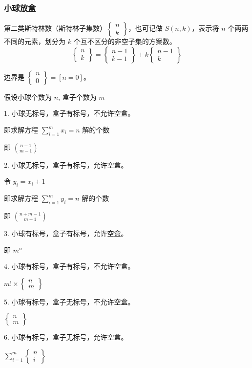 \documentclass[a4paper]{article}
\begin{document}
\subsubsection{小球放盒}
第二类斯特林数（斯特林子集数）$\begin{Bmatrix}n\\ k\end{Bmatrix}$，也可记做 $S(n,k)$，表示将 $n$ 个两两不同的元素，划分为 $k$ 个互不区分的非空子集的方案数。
$$
\begin{Bmatrix}n\\ k\end{Bmatrix}=\begin{Bmatrix}n-1\\ k-1\end{Bmatrix}+k\begin{Bmatrix}n-1\\ k\end{Bmatrix}
$$

边界是 $\begin{Bmatrix}n\\ 0\end{Bmatrix}=[n=0]$。

假设小球个数为 $n$, 盒子个数为 $m$

1. 小球无标号，盒子有标号，不允许空盒。

   即求解方程 $\sum\limits_{i=1}^mx_i=n$ 解的个数

   即 $\binom{n-1}{m-1}$

2. 小球无标号，盒子有标号，允许空盒。

   令 $y_i=x_i+1$

   即求解方程 $\sum\limits_{i=1}^my_i=n$ 解的个数

   即 $\binom{n+m-1}{m-1}$

3. 小球有标号，盒子有标号，允许空盒。

   即 $m^n$

4. 小球有标号，盒子有标号，不允许空盒。

   $m!\times \begin{Bmatrix}n\\ m\end{Bmatrix}$

5. 小球有标号，盒子无标号，不允许空盒。

   $\begin{Bmatrix}n\\ m\end{Bmatrix}$

6. 小球有标号，盒子无标号，允许空盒。

   $\sum\limits_{i=1}^m\begin{Bmatrix}n\\ i\end{Bmatrix}$
\end{document}
